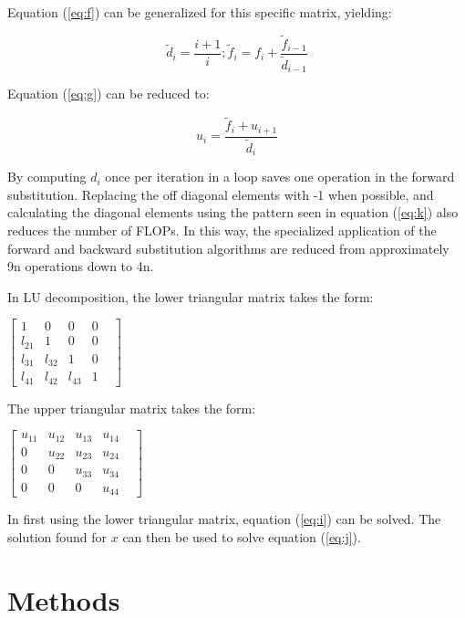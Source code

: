 \documentclass[10pt,showpacs,preprintnumbers,footinbib,amsmath,amssymb,aps,prl,twocolumn,groupedaddress,superscriptaddress,showkeys]{revtex4-1}
\begin{document}
Equation (\ref{eq:f}) can be generalized for this specific matrix, yielding: 

	\begin{equation}
        \label{eq:k}
	\tilde{d}_{i}=\frac{i+1}{i};  
	\tilde{f}_{i}=f_{i}+\frac{\tilde{f}_{i-1}}{\tilde{d}_{i-1}}
	\end{equation}

Equation (\ref{eq:g}) can be reduced to:

	\begin{equation}
	u_{i} = \frac{\tilde{f}_{i}+u_{i+1}}{\tilde{d}_{i}}
	\end{equation}

By computing $d_{i}$ once per iteration in a loop saves one operation in the forward substitution. Replacing the off diagonal elements with -1 when possible, and calculating the diagonal elements using the pattern seen in equation (\ref{eq:k}) also reduces the number of FLOPs. In this way, the specialized application of the forward and backward substitution algorithms are reduced from approximately 9n operations down to 4n.

In LU decomposition, the lower triangular matrix takes the form:
\begin{center}
$\begin{bmatrix}
			1 & 0 & 0 & 0 \\
			l_{21} & 1 & 0 & 0 & \\
			l_{31} &l_{32}& 1 & 0   \\
			l_{41}&l_{42}&l_{43}& 1 
\end{bmatrix}$
\end{center}
The upper triangular matrix takes the form:
\begin{center}
$\begin{bmatrix}
			u_{11}&u_{12}&u_{13}&u_{14}\\
			0 & u_{22} & u_{23}& u_{24} & \\
			0 & 0 & u_{33} & u_{34}   \\
			0 & 0 & 0 & u_{44}
\end{bmatrix}$
\end{center}
In first using the lower triangular matrix, equation (\ref{eq:i}) can be solved. The solution found for $x$ can then be used to solve equation (\ref{eq:j}).
\section{Methods}
\end{document}
